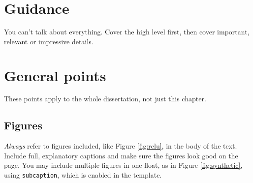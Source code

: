 \documentclass{l4proj}
\begin{document}
\section{Guidance}
You can't talk about everything. Cover the high level first, then cover important, relevant or impressive details.


\section{General points}
These points apply to the whole dissertation, not just this chapter.


\subsection{Figures}
\emph{Always} refer to figures included, like Figure \ref{fig:relu}, in the body of the text. Include full, explanatory captions and make sure the figures look good on the page.
You may include multiple figures in one float, as in Figure \ref{fig:synthetic}, using \texttt{subcaption}, which is enabled in the template.
\end{document}
